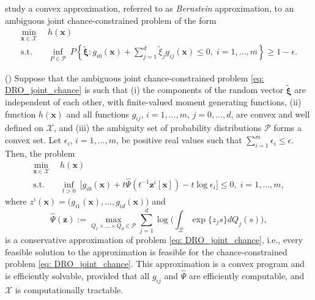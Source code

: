 \documentclass[final,onefignum,onetabnum]{class}
\newcommand{\bs}[1]{\boldsymbol{#1}} %
\newcommand{\Cs}[1]{\mathcal{#1}} %
\newcommand{\txi}{\tilde{\bs{\xi}}}
\newcommand{\st}{\text{s.t.}}
\begin{document}
\citet{nemirovski2006convex} study a convex approximation, referred to as {\it Bernstein} approximation, to an ambiguous joint chance-constrained problem of the form 
\begin{subequations}
\label{eq: DRO_joint_chance}
\begin{align}
    \min_{\bs{x} \in \Cs{X} } \ & h(\bs{x}) \\
    \st \quad  &  \inf_{P \in \Cs{P} } \ P \left \lbrace \txi : g_{i0}(\bs{x}) + \sum_{j=1}^{d} \tilde{\xi}_{j} g_{ij}(\bs{x}) \le 0, \; i=1, \ldots, m \right \rbrace  \ge 1- \epsilon.
\end{align}
\end{subequations}
\begin{theorem}{(\citet[Theorem~6.2]{nemirovski2006convex})}
    \label{thm: rev.Bernstein}
    Suppose that the ambiguous joint chance-constrained problem \eqref{eq: DRO_joint_chance} is such that (i) the components of the random vector $\txi$ are independent of each other, with finite-valued moment generating functions, (ii)  function $h(\bs{x})$ and all functions $g_{ij}$, $i=1, \ldots, m$, $j=0, \ldots, d$, are convex and well defined on $\Cs{X}$, and (iii)  the ambiguity set of probability distributions $\Cs{P}$ forms a convex set. 
    Let $\epsilon_{i}$, $i=1, \ldots, m$, be positive real values such that $\sum_{i=1}^{m} \epsilon_{i} \le \epsilon$. Then, the problem 
    \begin{align*}
        \min_{\bs{x} \in \Cs{X} } \ & h(\bs{x}) \\
        \st \quad  &  \inf_{t >0 } \ \big [g_{i0}(\bs{x}) + t \hat{\Psi} (t^{-1}\bs{z}^{i}[\bs{x}]) - t \log \epsilon_{i} \big] \le 0, \; i=1, \ldots, m,
    \end{align*}
    where $z^{i}(\bs{x})=\big(g_{i1}(\bs{x}), \ldots, g_{id}(\bs{x})\big)$ and $$\hat{\Psi}(\bs{z}):=\max_{Q_{1} \times \ldots \times Q_{d} \in \Cs{P}} \sum_{j=1}^{d} \log \Big( \int_{\Xi} \exp\{z_{j}s\}d Q_{j}(s) \Big),$$
    is a conservative approximation of problem \eqref{eq: DRO_joint_chance}, i.e., every feasible solution to the approximation is feasible for the chance-constrained problem \eqref{eq: DRO_joint_chance}. This approximation is a convex program and is efficiently solvable, provided that all $g_{ij}$ and $\hat{\Psi}$ are efficiently computable, and $\Cs{X}$ is computationally tractable.  
\end{theorem}
\end{document}
